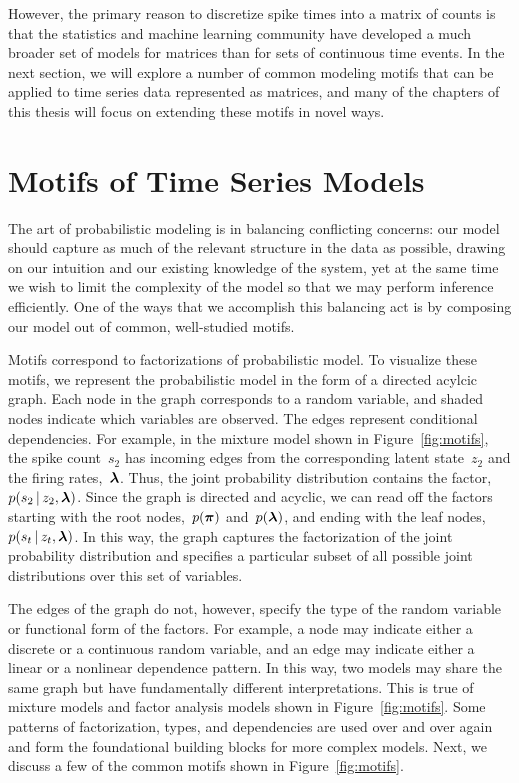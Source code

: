 However, the primary reason to discretize spike times into a matrix of
counts is that the statistics and machine learning community have
developed a much broader set of models for matrices than for sets of
continuous time events.  In the next section, we will explore a number
of common modeling motifs that can be applied to time series data
represented as matrices, and many of the chapters of this thesis will
focus on extending these motifs in novel ways.


\section{Motifs of Time Series Models}
\label{sec:motifs}
The art of probabilistic modeling is in balancing conflicting concerns:
our model should capture as much of the relevant structure in the data 
as possible, drawing on our intuition and our existing knowledge of the 
system, yet at the same time we wish to limit the complexity of the model
so that we may perform inference efficiently. One of the ways that we 
accomplish this balancing act is by composing our model out of common,
well-studied motifs. 

Motifs correspond to factorizations of probabilistic model.  To
visualize these motifs, we represent the probabilistic model in the
form of a directed acylcic graph. Each node in the graph corresponds
to a random variable, and shaded nodes indicate which variables are
observed. The edges represent conditional dependencies. For example,
in the mixture model shown in Figure~\ref{fig:motifs}, the spike
count~$s_2$ has incoming edges from the corresponding latent
state~$z_2$ and the firing rates,~$\boldsymbol{\lambda}$.  Thus, the joint
probability distribution contains the factor,~$p(s_2 \,|\, z_2,
\boldsymbol{\lambda})$. Since the graph is directed and acyclic, we can read off
the factors starting with the root nodes,~$p(\boldsymbol{\pi})$ and~$p(\boldsymbol{\lambda})$,
and ending with the leaf nodes, ~$p(s_t \,|\, z_t, \boldsymbol{\lambda})$. In
this way, the graph captures the factorization of the joint
probability distribution and specifies a particular subset of all
possible joint distributions over this set of variables.

The edges of the graph do not, however, specify the type of the random
variable or functional form of the factors. For example, a node may
indicate either a discrete or a continuous random variable, and an
edge may indicate either a linear or a nonlinear dependence
pattern. In this way, two models may share the same graph but have
fundamentally different interpretations. This is true of mixture
models and factor analysis models shown in Figure~\ref{fig:motifs}.
Some patterns of factorization, types, and dependencies are used
over and over again and form the foundational
building blocks for more complex models.
Next, we discuss a few of the common motifs shown in Figure~\ref{fig:motifs}.

